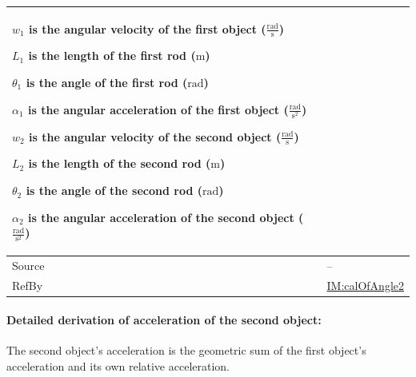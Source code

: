 \documentclass[12pt]{article}
\begin{document}
{\begin{minipage}{\textwidth}
\begin{tabular}{>{\raggedright}p{}>{\raggedright\arraybackslash}p{}}
\begin{symbDescription}
              \item{${w_{1}}$ is the angular velocity of the first object ($\frac{\text{rad}}{\text{s}}$)}
              \item{${L_{1}}$ is the length of the first rod (${\text{m}}$)}
              \item{${θ_{1}}$ is the angle of the first rod (${\text{rad}}$)}
              \item{${α_{1}}$ is the angular acceleration of the first object ($\frac{\text{rad}}{\text{s}^{2}}$)}
              \item{${w_{2}}$ is the angular velocity of the second object ($\frac{\text{rad}}{\text{s}}$)}
              \item{${L_{2}}$ is the length of the second rod (${\text{m}}$)}
              \item{${θ_{2}}$ is the angle of the second rod (${\text{rad}}$)}
              \item{${α_{2}}$ is the angular acceleration of the second object ($\frac{\text{rad}}{\text{s}^{2}}$)}
              \end{symbDescription}
\\ \midrule
Source & --
         
\\ \midrule
RefBy & \hyperref[IM:calOfAngle2]{IM:calOfAngle2}
        
\\ \bottomrule
\end{tabular}
\end{minipage}

\paragraph{Detailed derivation of acceleration of the second object:}
\label{GD:accelerationVector2Deriv}
The second object's acceleration is the geometric sum of the first object's acceleration and its own relative acceleration.

}
\end{document}
